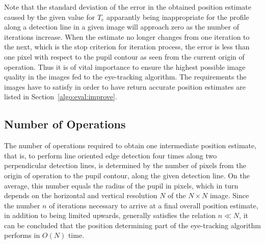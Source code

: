 Note that the standard deviation of the error in the obtained position
estimate caused by the given value for $T_{e}$ apparantly being
inappropriate for the profile along a detection line in a given image
will approach zero as the number of iterations increase.  When the
estimate no longer changes from one iteration to the next, which is
the stop criterion for iteration process, the error is less than one
pixel with respect to the pupil contour as seen from the current
origin of operation.  Thus it is of vital importance to ensure the
highest possible image quality in the images fed to the {\octopus}
eye-tracking algorithm.  The requirements the images have to satisfy
in order to have {\octopus} return accurate position estimates are
listed in Section~\ref{algo:eval:improve}.

\subsection{Number of Operations}
\label{algo:pos:O}

The number of operations required to obtain one intermediate position
estimate, that is, to perform line oriented edge detection four times
along two perpendicular detection lines, is determined by the number
of pixels from the origin of operation to the pupil contour, along the
given detection line.  On the average, this number equals the radius
of the pupil in pixels, which in turn depends on the horizontal and
vertical resolution $N$ of the $N\times N$ image.  Since the number
$n$ of iterations necessary to arrive at a final overall position
estimate, in addition to being limited upwards, generally satisfies
the relation $n\ll N$, it can be concluded that the position
determining part of the {\octopus} eye-tracking algorithm performs in
$O(N)$ time.
